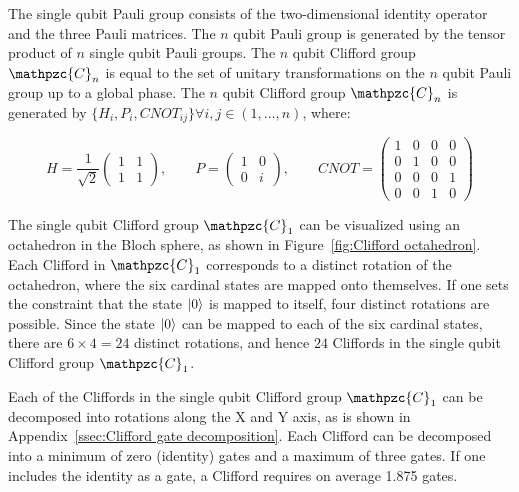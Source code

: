       The single qubit Pauli group consists of the two-dimensional identity operator and the three Pauli matrices. The $n$ qubit Pauli group is generated by the tensor product of $n$ single qubit Pauli groups. The $n$ qubit Clifford group $\mathpzc{C}_n$ is equal to the set of unitary transformations on the $n$ qubit Pauli group up to a global phase. The $n$ qubit Clifford group $\mathpzc{C}_n$ is generated by $\{H_i, P_i, CNOT_{ij}\} \forall i, j \in (1, \dots, n)$, where:

      \begin{equation}
        H =
        \frac{1}{\sqrt{2}}
        \begin{pmatrix}
          1 & 1 \\
          1 & 1
        \end{pmatrix}, \qquad
        P =
        \begin{pmatrix}
          1 & 0 \\
          0 & i
        \end{pmatrix}, \qquad
        CNOT =
        \begin{pmatrix}
          1 & 0 & 0 & 0 \\
          0 & 1 & 0 & 0 \\
          0 & 0 & 0 & 1 \\
          0 & 0 & 1 & 0
        \end{pmatrix}
      \end{equation}

      The single qubit Clifford group $\mathpzc{C}_1$ can be visualized using an octahedron in the Bloch sphere, as shown in Figure~\ref{fig:Clifford octahedron}. Each Clifford in $\mathpzc{C}_1$ corresponds to a distinct rotation of the octahedron, where the six cardinal states are mapped onto themselves. If one sets the constraint that the state $\ket{0}$ is mapped to itself, four distinct rotations are possible. Since the state $\ket{0}$ can be mapped to each of the six cardinal states, there are $6 \times 4=24$ distinct rotations, and hence $24$ Cliffords in the single qubit Clifford group $\mathpzc{C}_1$.

      Each of the Cliffords in the single qubit Clifford group $\mathpzc{C}_1$ can be decomposed into rotations along the X and Y axis, as is shown in Appendix~\ref{ssec:Clifford gate decomposition}. Each Clifford can be decomposed into a minimum of zero (identity) gates and a maximum of three gates. If one includes the identity as a gate, a Clifford requires on average 1.875 gates.

